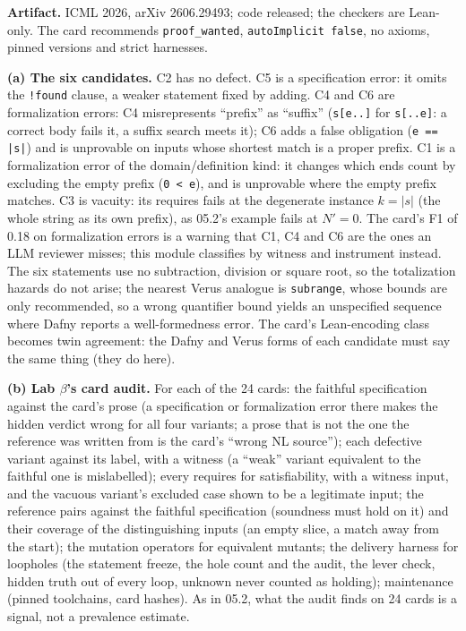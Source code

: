 \documentclass[11pt]{article}
\begin{document}
\begin{answer}
\textbf{Artifact.} ICML 2026, arXiv 2606.29493; code released; the checkers are
Lean-only. The card recommends \texttt{proof\_wanted}, \texttt{autoImplicit
false}, no axioms, pinned versions and strict harnesses.

\textbf{(a) The six candidates.} C2 has no defect. C5 is a specification
error: it omits the \texttt{!found} clause, a weaker statement fixed by adding.
C4 and C6 are formalization errors: C4 misrepresents ``prefix'' as
``suffix'' (\texttt{s[e..]} for \texttt{s[..e]}: a correct body fails it, a
suffix search meets it); C6 adds a false obligation (\texttt{e == |s|}) and is
unprovable on inputs whose shortest match is a proper prefix. C1 is a
formalization error of the domain/definition kind: it changes which ends
count by excluding the empty prefix (\texttt{0 < e}), and is unprovable where
the empty prefix matches. C3 is vacuity: its requires fails at the degenerate
instance $k=|s|$ (the whole string as its own prefix), as 05.2's example fails
at $N'=0$. The card's F1 of 0.18 on formalization errors is a warning that C1,
C4 and C6 are the ones an LLM reviewer misses; this module classifies by
witness and instrument instead.
The six statements use no subtraction, division or square root, so the
totalization hazards do not arise; the nearest Verus analogue is
\texttt{subrange}, whose bounds are only recommended, so a wrong quantifier
bound yields an unspecified sequence where Dafny reports a well-formedness
error. The card's Lean-encoding class becomes twin agreement: the Dafny and
Verus forms of each candidate must say the same thing (they do here).

\textbf{(b) Lab $\beta$'s card audit.} For each of the 24 cards: the faithful
specification against the card's prose (a specification or formalization
error there makes the hidden verdict wrong for all four variants; a prose that
is not the one the reference was written from is the card's ``wrong NL
source''); each defective variant against its label, with a witness (a
``weak'' variant equivalent to the faithful one is mislabelled); every
requires for satisfiability, with a witness input, and the vacuous variant's
excluded case shown to be a legitimate input; the reference pairs against the
faithful specification (soundness must hold on it) and their coverage of the
distinguishing inputs (an empty slice, a match away from the start); the
mutation operators for equivalent mutants; the delivery harness for loopholes
(the statement freeze, the hole count and the audit, the lever check, hidden
truth out of every loop, unknown never counted as holding); maintenance
(pinned toolchains, card hashes). As in 05.2, what the audit finds on 24 cards
is a signal, not a prevalence estimate.


\end{answer}
\end{document}
